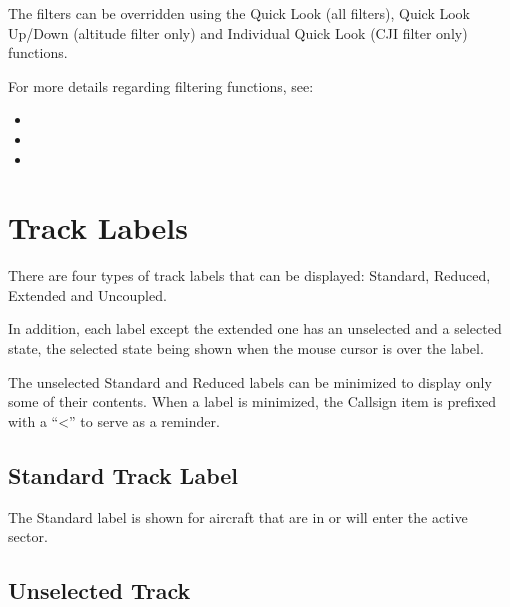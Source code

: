 \documentclass[a4paper,oneside,11pt]{memoir}
\begin{document}
The filters can be overridden using the Quick Look (all filters), Quick Look Up/Down (altitude filter only) and Individual Quick Look (CJI filter only) functions.

\bigskip

For more details regarding filtering functions, see:

\begin{itemize}
  \item {}
  \item {}
  \item {}
\end{itemize}

\section{Track Labels}
\label{tlabel}

There are four types of track labels that can be displayed: Standard, Reduced, Extended and Uncoupled.

In addition, each label except the extended one has an unselected and a selected state, the selected state being shown when the mouse cursor is over the label.

\bigskip

The unselected Standard and Reduced labels can be minimized to display only some of their contents. When a label is minimized, the Callsign item is prefixed with a “<” to serve as a reminder.

\subsection{Standard Track Label}
\label{tlabel:std}

The Standard label is shown for aircraft that are in or will enter the active sector.

\subsection*{Unselected Track}
\end{document}
